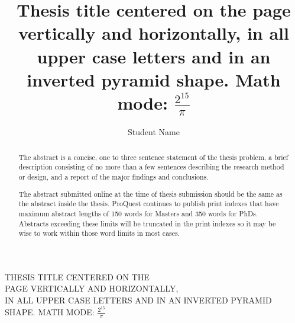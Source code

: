 \documentclass[12pt]{mines-thesis}
\begin{document}
	\autotitle %
	\title{Thesis title centered on the page vertically and horizontally, in all upper case letters
		and in an inverted pyramid shape. Math mode: $\frac{2^{15}}{\pi}$
	}
	
	\author{Student Name}  %
	
	
	
	\begin{abstract}
		The abstract is a concise, one to three sentence statement of the thesis problem, a brief description consisting of no more than a few sentences describing the research method or design, and a report of the major findings and conclusions.
		
		The abstract submitted online at the time of thesis submission should be the same as the abstract inside the thesis. ProQuest continues to publish print indexes that have maximum abstract lengths of 150 words for Masters and 350 words for PhDs. Abstracts exceeding these limits will be truncated in the print indexes so it may be wise to work within those word limits in most cases.
	\end{abstract}
	

	\makefrontmatter


\lipsum[1-20]
{
	\centering
	\MakeTextUppercase{
		Thesis title centered on the \protect\\page vertically and horizontally,\protect\\
		in all upper case letters and in an inverted 
		pyramid shape. Math mode: $\frac{2^{15}}{\pi}$
	}
	
}
\end{document}
